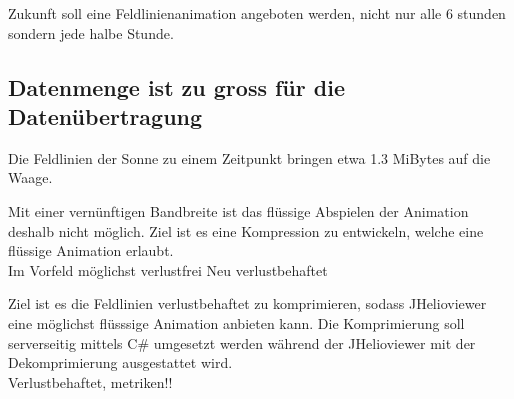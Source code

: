 Zukunft soll eine Feldlinienanimation angeboten werden, nicht nur alle 6 stunden sondern jede halbe Stunde.

\subsection{Datenmenge ist zu gross für die Datenübertragung}
Die Feldlinien der Sonne zu einem Zeitpunkt bringen etwa 1.3 MiBytes auf die Waage. 

Mit einer vernünftigen Bandbreite ist das flüssige Abspielen der Animation deshalb nicht möglich. Ziel ist es eine Kompression zu entwickeln, welche eine flüssige Animation erlaubt.\\[\baselineskip]
Im Vorfeld möglichst verlustfrei
Neu verlustbehaftet

Ziel ist es die Feldlinien verlustbehaftet zu komprimieren, sodass JHelioviewer eine möglichst flüsssige Animation anbieten kann. Die Komprimierung soll serverseitig mittels C\# umgesetzt werden während der JHelioviewer mit der Dekomprimierung ausgestattet wird.\\[\baselineskip] 
Verlustbehaftet, metriken!!

 